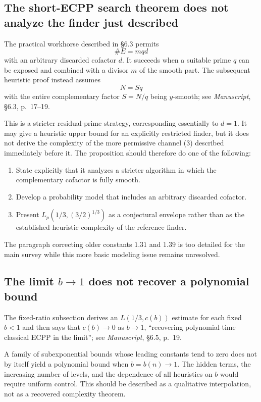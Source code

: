 \documentclass[11pt]{amsart}
\newcommand{\Lt}[2]{L_p\!\left(#1,#2\right)}
\newcommand{\sourceat}[2]{\emph{Manuscript}, \S#1, p.~#2}
\begin{document}
\subsection{The short-ECPP search theorem does not analyze the finder just described}

The practical workhorse described in \S6.3 permits
\[
 \#E=mqd
\]
with an arbitrary discarded cofactor $d$.  It succeeds when a suitable prime $q$ can be exposed and combined with a divisor $m$ of the smooth part.  The subsequent heuristic proof instead assumes
\[
 N=S q
\]
with the entire complementary factor $S=N/q$ being $y$-smooth; see \sourceat{6.3}{17--19}.

This is a stricter residual-prime strategy, corresponding essentially to $d=1$.  It may give a heuristic upper bound for an explicitly restricted finder, but it does not derive the complexity of the more permissive channel (3) described immediately before it.  The proposition should therefore do one of the following:

\begin{enumerate}
\item State explicitly that it analyzes a stricter algorithm in which the complementary cofactor is fully smooth.
\item Develop a probability model that includes an arbitrary discarded cofactor.
\item Present $\Lt{1/3}{(3/2)^{1/3}}$ as a conjectural envelope rather than as the established heuristic complexity of the reference finder.
\end{enumerate}

The paragraph correcting older constants $1.31$ and $1.39$ is too detailed for the main survey while this more basic modeling issue remains unresolved.

\subsection{The limit \texorpdfstring{$b\to1$}{b to 1} does not recover a polynomial bound}

The fixed-ratio subsection derives an $L(1/3,c(b))$ estimate for each fixed $b<1$ and then says that $c(b)\to0$ as $b\to1$, ``recovering polynomial-time classical ECPP in the limit''; see \sourceat{6.5}{19}.

A family of subexponential bounds whose leading constants tend to zero does not by itself yield a polynomial bound when $b=b(n)\to1$.  The hidden terms, the increasing number of levels, and the dependence of all heuristics on $b$ would require uniform control.  This should be described as a qualitative interpolation, not as a recovered complexity theorem.
\end{document}
